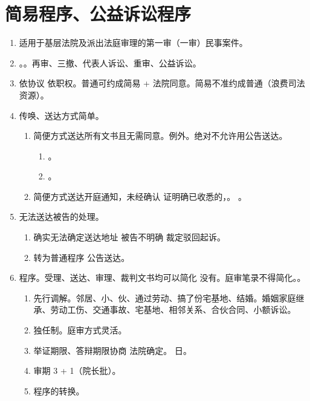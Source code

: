 \section{简易程序、公益诉讼程序}
\begin{enumerate}
  \item 适用于基层法院及派出法庭审理的第一审（\bdy 一审）民事案件。
  \item {}。。再审、三撤、代表人诉讼、重审、公益诉讼。
  \item 依协议 \hz 依职权。普通可约成简易 + 法院同意。简易不准约成普通（浪费司法资源）。
  \item 传唤、送达方式简单。
        \begin{enumerate}
          \item 简便方式送达所有文书且无需同意。例外。绝对不允许用公告送达。
                \begin{enumerate}
                  \item {}。
                  \item {}。
                \end{enumerate}
          \item 简便方式送达开庭通知，未经确认 \hz 证明确已收悉的，。
                。
        \end{enumerate}
  \item 无法送达被告的处理。
        \begin{enumerate}
          \item 确实无法确定送达地址 \ydy 被告不明确 \yjt 裁定驳回起诉。
          \item 转为普通程序 \yjt 公告送达。
        \end{enumerate}
  \item 程序。受理、送达、审理、裁判文书均可以简化 \bdy 没有。庭审笔录不得简化。。
        \begin{enumerate}
          \item 先行调解。邻居、小、伙、通过劳动、搞了份宅基地、结婚。婚姻家庭继承、劳动工伤、交通事故、宅基地、相邻关系、合伙合同、小额诉讼。
          \item 独任制。庭审方式灵活。
          \item 举证期限、答辩期限协商 \hz 法院确定。 日。
          \item 审期 3 + 1（院长批）。
          \item 程序的转换。

\end{enumerate}
\end{enumerate}
